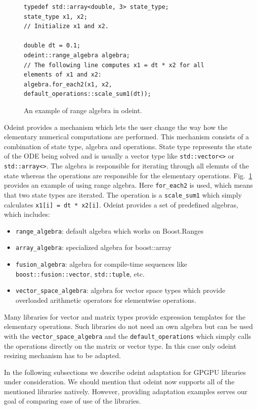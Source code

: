 \documentclass[1p]{elsarticle}
\newcommand{\code}[1]{\lstinline|#1|}
\newcommand{\figref}[1]{Fig.~\ref{#1}}
\begin{document}
\begin{figure}
\begin{lstlisting}
typedef std::array<double, 3> state_type;
state_type x1, x2;
// Initialize x1 and x2.

double dt = 0.1;
odeint::range_algebra algebra;
// The following line computes x1 = dt * x2 for all elements of x1 and x2:
algebra.for_each2(x1, x2, default_operations::scale_sum1(dt));
\end{lstlisting}
\caption{An example of range algebra in odeint.}
\label{fig:odeintops}
\end{figure}

Odeint provides a mechanism which lets the user change the way how the
elementary numerical computations are performed. This mechanism consists of a
combination of state type, algebra and operations. State type represents the
state of the ODE being solved and is usually a vector type like
\code{std::vector<>} or \code{std::array<>}. The algebra is responsible for
iterating through all elemnts of the state whereas the operations are
responsible for the elementary operations. \figref{fig:odeintops} provides an
example of using range algebra. Here \code{for_each2} is used, which means that
two state types are iterated. The operation is a \code{scale_sum1} which simply
calculates \code{x1[i] = dt * x2[i]}. Odeint provides a set of predefined
algebras, which includes:
\begin{itemize}
    \item \code{range_algebra}: default algebra which works on Boost.Ranges
    \item \code{array_algebra}: specialized algebra for boost::array
    \item \code{fusion_algebra}: algebra for compile-time sequences like
        \code{boost::fusion::vector}, \code{std::tuple}, etc.
    \item \code{vector_space_algebra}: algebra for vector space types which
        provide overloaded arithmetic operators for elementwise operations.
\end{itemize}

Many libraries for vector and matrix types provide expression templates for the
elementary operations. Such libraries do not need an own algebra but can be
used with the \code{vector_space_algebra} and the \code{default_operations}
which simply calls the operations directly on the matrix or vector type. In
this case only odeint resizing mechanism has to be adapted.

In the following subsections we describe odeint adaptation for GPGPU libraries
under consideration. We should mention that odeint now supports all of the
mentioned libraries natively. However, providing adaptation examples serves our
goal of comparing ease of use of the libraries.
\end{document}
